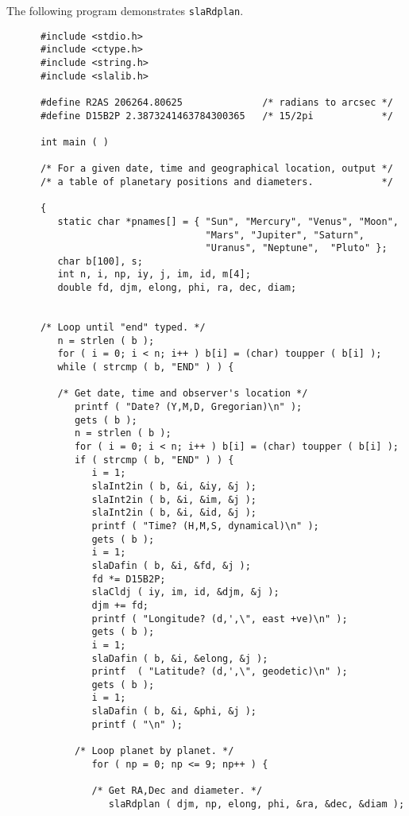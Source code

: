 \documentclass[11pt,fleqn,twoside]{article}
\renewcommand{\_}{{\tt\char'137}}     %
\begin{document}
The following program demonstrates
{\tt slaRdplan}.
\goodbreak
\vspace{-3ex}
\begin{verbatim}
      #include <stdio.h>
      #include <ctype.h>
      #include <string.h>
      #include <slalib.h>

      #define R2AS 206264.80625              /* radians to arcsec */
      #define D15B2P 2.3873241463784300365   /* 15/2pi            */

      int main ( )

      /* For a given date, time and geographical location, output */
      /* a table of planetary positions and diameters.            */

      {
         static char *pnames[] = { "Sun", "Mercury", "Venus", "Moon",
                                   "Mars", "Jupiter", "Saturn",
                                   "Uranus", "Neptune",  "Pluto" };
         char b[100], s;
         int n, i, np, iy, j, im, id, m[4];
         double fd, djm, elong, phi, ra, dec, diam;


      /* Loop until "end" typed. */
         n = strlen ( b );
         for ( i = 0; i < n; i++ ) b[i] = (char) toupper ( b[i] );
         while ( strcmp ( b, "END" ) ) {

         /* Get date, time and observer's location */
            printf ( "Date? (Y,M,D, Gregorian)\n" );
            gets ( b );
            n = strlen ( b );
            for ( i = 0; i < n; i++ ) b[i] = (char) toupper ( b[i] );
            if ( strcmp ( b, "END" ) ) {
               i = 1;
               slaInt2in ( b, &i, &iy, &j );
               slaInt2in ( b, &i, &im, &j );
               slaInt2in ( b, &i, &id, &j );
               printf ( "Time? (H,M,S, dynamical)\n" );
               gets ( b );
               i = 1;
               slaDafin ( b, &i, &fd, &j );
               fd *= D15B2P;
               slaCldj ( iy, im, id, &djm, &j );
               djm += fd;
               printf ( "Longitude? (d,',\", east +ve)\n" );
               gets ( b );
               i = 1;
               slaDafin ( b, &i, &elong, &j );
               printf  ( "Latitude? (d,',\", geodetic)\n" );
               gets ( b );
               i = 1;
               slaDafin ( b, &i, &phi, &j );
               printf ( "\n" );

            /* Loop planet by planet. */
               for ( np = 0; np <= 9; np++ ) {

               /* Get RA,Dec and diameter. */
                  slaRdplan ( djm, np, elong, phi, &ra, &dec, &diam );


\end{verbatim}
\end{document}
